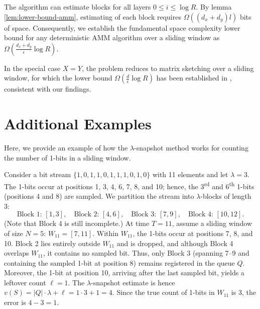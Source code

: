 The algorithm can estimate blocks for all layers $0\leq i\leq \log{R}$. By lemma \ref{lem:lower-bound-amm}, estimating of each block requires $\Omega((d_x+d_y)l)$ bits of space. Consequently, we establish the fundamental space complexity lower bound for any deterministic AMM algorithm over a sliding window as $\Omega(\frac{d_x+d_y}{\epsilon}\log{R})$. 

In the special case $X=Y$, the problem reduces to matrix sketching over a sliding window, for which the lower bound $\Omega(\frac{d}{\epsilon}\log{R})$ has been established in \cite{YinWLWZHL24}, consistent with our findings.

\section{Additional Examples}\label{app:examples}

Here, we provide an example of how the $\lambda$-snapshot method works for counting the number of 1-bits in a sliding window.
\begin{example}
Consider a bit stream 
\(
\{1,0,1,1,0,1,1,1,0,1,0\}
\)
with 11 elements and let \(\lambda=3\). The 1-bits occur at positions 1, 3, 4, 6, 7, 8, and 10; hence, the 3\textsuperscript{rd} and 6\textsuperscript{th} 1-bits (positions 4 and 8) are sampled. We partition the stream into \(\lambda\)-blocks of length 3:
\[
\text{Block 1: } [1,3],\quad \text{Block 2: } [4,6],\quad \text{Block 3: } [7,9],\quad \text{Block 4: } [10,12].
\]
(Note that Block 4 is still incomplete.) At time \(T=11\), assume a sliding window of size \(N=5\):
\(
W_{11} = [7,11].
\)
Within \(W_{11}\), the 1-bits occur at positions 7, 8, and 10. Block 2 lies entirely outside \(W_{11}\) and is dropped, and although Block 4 overlaps \(W_{11}\), it contains no sampled bit. Thus, only Block 3 (spanning 7–9 and containing the sampled 1-bit at position 8) remains registered in the queue \(Q\). Moreover, the 1-bit at position 10, arriving after the last sampled bit, yields a leftover count \(\ell=1\). The \(\lambda\)-snapshot estimate is hence
\(
v(S)=|Q|\cdot\lambda + \ell = 1\cdot3 + 1 = 4.
\)
Since the true count of 1-bits in \(W_{11}\) is 3, the error is \(4-3=1\).
\end{example}
